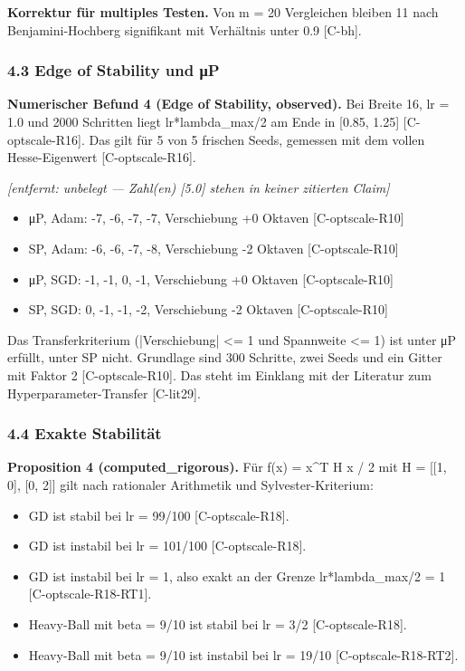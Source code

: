 \documentclass[10pt,twocolumn]{article}
\begin{document}
\textbf{Korrektur für multiples Testen.} Von m = 20 Vergleichen bleiben 11 nach Benjamini-Hochberg signifikant mit Verhältnis unter 0.9 {\scriptsize[C-bh]}.

\subsubsection*{4.3 Edge of Stability und μP}

\textbf{Numerischer Befund 4 (Edge of Stability, observed).} Bei Breite 16, lr = 1.0 und 2000 Schritten liegt lr*lambda_max/2 am Ende in [0.85, 1.25] {\scriptsize[C-optscale-R16]}. Das gilt für 5 von 5 frischen Seeds, gemessen mit dem vollen Hesse-Eigenwert {\scriptsize[C-optscale-R16]}.

\emph{[entfernt: unbelegt — Zahl(en) [5.0] stehen in keiner zitierten Claim]}

\begin{itemize}
\item μP, Adam: -7, -6, -7, -7, Verschiebung +0 Oktaven {\scriptsize[C-optscale-R10]}
\item SP, Adam: -6, -6, -7, -8, Verschiebung -2 Oktaven {\scriptsize[C-optscale-R10]}
\item μP, SGD: -1, -1, 0, -1, Verschiebung +0 Oktaven {\scriptsize[C-optscale-R10]}
\item SP, SGD: 0, -1, -1, -2, Verschiebung -2 Oktaven {\scriptsize[C-optscale-R10]}
\end{itemize}

Das Transferkriterium (|Verschiebung| <= 1 und Spannweite <= 1) ist unter μP erfüllt, unter SP nicht. Grundlage sind 300 Schritte, zwei Seeds und ein Gitter mit Faktor 2 {\scriptsize[C-optscale-R10]}. Das steht im Einklang mit der Literatur zum Hyperparameter-Transfer {\scriptsize[C-lit29]}.

\subsubsection*{4.4 Exakte Stabilität}

\textbf{Proposition 4 (computed_rigorous).} Für f(x) = x^T H x / 2 mit H = [[1, 0], [0, 2]] gilt nach rationaler Arithmetik und Sylvester-Kriterium:

\begin{itemize}
\item GD ist stabil bei lr = 99/100 {\scriptsize[C-optscale-R18]}.
\item GD ist instabil bei lr = 101/100 {\scriptsize[C-optscale-R18]}.
\item GD ist instabil bei lr = 1, also exakt an der Grenze lr*lambda_max/2 = 1 {\scriptsize[C-optscale-R18-RT1]}.
\item Heavy-Ball mit beta = 9/10 ist stabil bei lr = 3/2 {\scriptsize[C-optscale-R18]}.
\item Heavy-Ball mit beta = 9/10 ist instabil bei lr = 19/10 {\scriptsize[C-optscale-R18-RT2]}.
\end{itemize}
\end{document}
